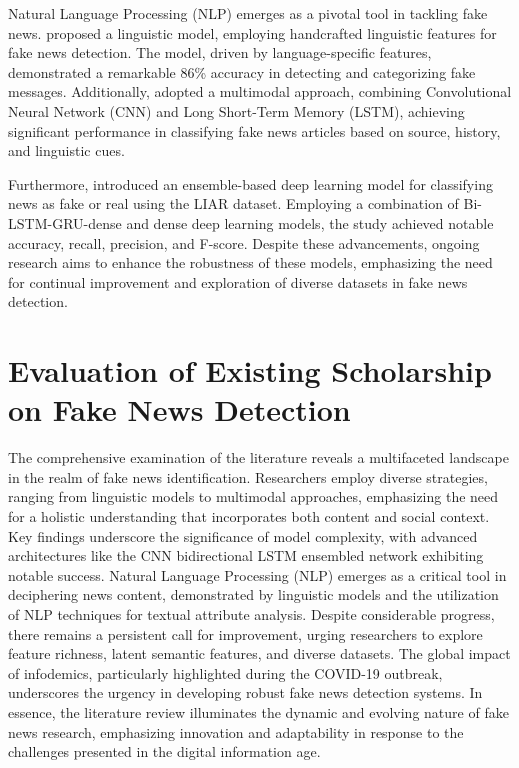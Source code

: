 Natural Language Processing (NLP) emerges as a pivotal tool in tackling fake news. \cite{choudhary2021linguistic} proposed a linguistic model, employing handcrafted linguistic features for fake news detection. The model, driven by language-specific features, demonstrated a remarkable 86\% accuracy in detecting and categorizing fake messages. Additionally, \cite{abdullah2020fake} adopted a multimodal approach, combining Convolutional Neural Network (CNN) and Long Short-Term Memory (LSTM), achieving significant performance in classifying fake news articles based on source, history, and linguistic cues.

Furthermore, \cite{aslam2021fake} introduced an ensemble-based deep learning model for classifying news as fake or real using the LIAR dataset. Employing a combination of Bi-LSTM-GRU-dense and dense deep learning models, the study achieved notable accuracy, recall, precision, and F-score. Despite these advancements, ongoing research aims to enhance the robustness of these models, emphasizing the need for continual improvement and exploration of diverse datasets in fake news detection.



\section{Evaluation of Existing Scholarship on Fake News Detection } %
The comprehensive examination of the literature reveals a multifaceted landscape in the realm of fake news identification. Researchers employ diverse strategies, ranging from linguistic models to multimodal approaches, emphasizing the need for a holistic understanding that incorporates both content and social context. Key findings underscore the significance of model complexity, with advanced architectures like the CNN bidirectional LSTM ensembled network exhibiting notable success. Natural Language Processing (NLP) emerges as a critical tool in deciphering news content, demonstrated by linguistic models and the utilization of NLP techniques for textual attribute analysis. Despite considerable progress, there remains a persistent call for improvement, urging researchers to explore feature richness, latent semantic features, and diverse datasets. The global impact of infodemics, particularly highlighted during the COVID-19 outbreak, underscores the urgency in developing robust fake news detection systems. In essence, the literature review illuminates the dynamic and evolving nature of fake news research, emphasizing innovation and adaptability in response to the challenges presented in the digital information age.
\\

